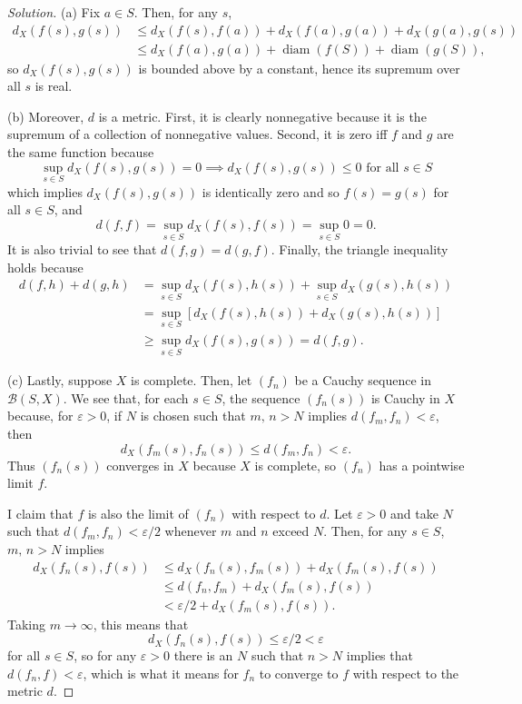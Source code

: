 \documentclass[11pt]{scrartcl}
\providecommand{\eps}{\varepsilon}
\newenvironment{soln}{\begin{proof}[Solution]}{\end{proof}}
\begin{document}
\begin{soln}
	(a) Fix $a\in S$. Then, for any $s$,
	\begin{align*}
		d_X(f(s), g(s)) &\le
		d_X(f(s), f(a)) + d_X(f(a), g(a)) + d_X(g(a), g(s))\\
		&\le d_X(f(a), g(a)) + \operatorname{diam}(f(S)) + \operatorname{diam}(g(S)),
	\end{align*}
	so $d_X(f(s), g(s))$ is bounded above by a constant,
	hence its supremum over all $s$ is real.
	
	(b) Moreover, $d$ is a metric.
	First, it is clearly nonnegative because it is the supremum of
	a collection of nonnegative values.
	Second, it is zero iff $f$ and $g$ are the same function because
	\[\sup_{s\in S} d_X(f(s), g(s)) = 0 \implies
	d_X(f(s), g(s)) \le 0 \text{ for all }s\in S\]
	which implies $d_X(f(s), g(s))$ is identically zero
	and so $f(s) = g(s)$ for all $s\in S$, and
	\[d(f, f) = \sup_{s\in S} d_X(f(s), f(s)) = \sup_{s\in S} 0 = 0.\]
	It is also trivial to see that $d(f, g) = d(g, f)$.
	Finally, the triangle inequality holds because
	\begin{align*}
		d(f, h) + d(g, h) &=
		\sup_{s\in S} d_X(f(s), h(s)) + \sup_{s\in S} d_X(g(s), h(s))\\
		&= \sup_{s\in S} [d_X(f(s), h(s)) + d_X(g(s), h(s))]\\
		&\ge \sup_{s\in S} d_X(f(s), g(s)) = d(f, g).
	\end{align*}
	
	(c) Lastly, suppose $X$ is complete. Then, let
	$(f_n)$ be a Cauchy sequence in $\mathcal B(S, X)$.
	We see that, for each $s\in S$, the sequence
	$(f_n(s))$ is Cauchy in $X$ because, for $\eps > 0$,
	if $N$ is chosen such that $m,\,n > N$ implies
	$d(f_m, f_n) < \eps$, then
	\[d_X(f_m(s), f_n(s)) \le d(f_m, f_n) < \eps.\]
	Thus $(f_n(s))$ converges in $X$ because $X$ is complete,
	so $(f_n)$ has a pointwise limit $f$.
	
	I claim that $f$ is also the limit of $(f_n)$ with respect to $d$.
	Let $\eps > 0$ and take $N$ such that $d(f_m, f_n) < \eps/2$
	whenever $m$ and $n$ exceed $N$. Then, for any $s\in S$,
	$m,\,n > N$ implies
	\begin{align*}
		d_X(f_n(s), f(s)) &\le d_X(f_n(s), f_m(s)) + d_X(f_m(s), f(s))\\
		&\le d(f_n, f_m) + d_X(f_m(s), f(s))\\
		& < \eps/2 + d_X(f_m(s), f(s)).
	\end{align*}
	Taking $m\to\infty$, this means that
	\[d_X(f_n(s), f(s)) \le \eps/2 < \eps\]
	for all $s\in S$, so for any $\eps > 0$ there is an $N$
	such that $n > N$ implies that $d(f_n, f)<\eps$,
	which is what it means for $f_n$ to converge to $f$
	with respect to the metric $d$.
\end{soln}
\end{document}
